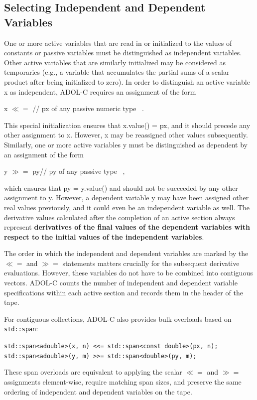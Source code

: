 \documentclass[11pt,twoside]{article}
\begin{document}
\subsection{Selecting Independent and Dependent Variables}
%
One or more active variables that are read in or initialized to
the values of constants or passive variables must be distinguished as
independent variables. Other active variables that are similarly 
initialized may be considered as temporaries (e.g., a variable that
accumulates the partial sums of a scalar product after being 
initialized to zero). In order to distinguish an active variable {\sf x} as
independent, ADOL-C requires an assignment of the form
\begin{center}
{\sf x} \boldmath $\ll=$ \hspace{0.2in}// {\sf px} of any passive numeric type $\enspace .$
\end{center}
This special initialization ensures that {\sf x.value()} = {\sf px}, and it should
precede any other assignment to {\sf x}. However, {\sf x} may be reassigned
other values subsequently. Similarly, one or more active variables {\sf y}
must be distinguished as dependent by an assignment of the form
\begin{center}
{\sf y \boldmath $\gg=$ \unboldmath py}\hspace{0.2in}// {\sf py} of any  passive type $\enspace ,$ 
\end{center}
which ensures that {\sf py} = {\sf y.value()} and should not be succeeded 
by any other assignment to {\sf y}. However, a dependent variable {\sf y} 
may have been assigned other real values previously, and it could even be an 
independent variable as well.  The derivative values calculated after
the
completion of an active section always represent {\bf derivatives of the final 
values of the dependent variables with respect to the initial values of the
independent variables}. 

The order in which the independent and dependent variables are marked
by the \boldmath $\ll=$ \unboldmath and \boldmath $\gg=$ \unboldmath statements matters crucially for the subsequent
derivative evaluations. However, these variables do not have to be
combined into contiguous vectors. ADOL-C counts the number of
independent and dependent variable specifications within each active
section and records them in the header of the tape.

For contiguous collections, ADOL-C also provides bulk overloads based
on \verb|std::span|:
\begin{center}
\verb|std::span<adouble>(x, n) <<= std::span<const double>(px, n);|\\
\verb|std::span<adouble>(y, m) >>= std::span<double>(py, m);|
\end{center}
These span overloads are equivalent to applying the scalar
\boldmath $\ll=$ \unboldmath and \boldmath $\gg=$ \unboldmath assignments element-wise,
require matching span sizes, and preserve the same ordering of
independent and dependent variables on the tape.
%
\end{document}

